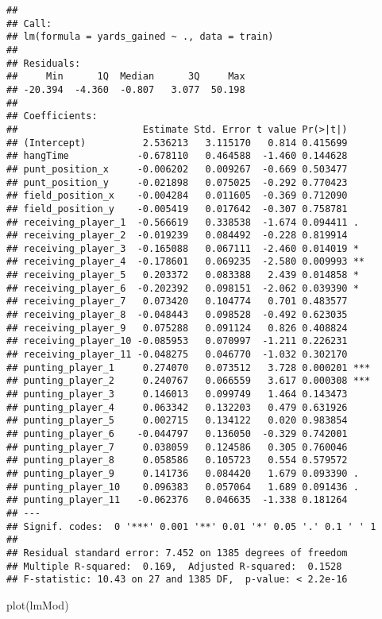 \documentclass[
]{article}
\newenvironment{Shaded}{\begin{snugshade}}{\end{snugshade}}
\newcommand{\FunctionTok}[1]{\textcolor[rgb]{0.00,0.00,0.00}{#1}}
\newcommand{\NormalTok}[1]{#1}
\begin{document}
\begin{verbatim}
## 
## Call:
## lm(formula = yards_gained ~ ., data = train)
## 
## Residuals:
##     Min      1Q  Median      3Q     Max 
## -20.394  -4.360  -0.807   3.077  50.198 
## 
## Coefficients:
##                      Estimate Std. Error t value Pr(>|t|)    
## (Intercept)          2.536213   3.115170   0.814 0.415699    
## hangTime            -0.678110   0.464588  -1.460 0.144628    
## punt_position_x     -0.006202   0.009267  -0.669 0.503477    
## punt_position_y     -0.021898   0.075025  -0.292 0.770423    
## field_position_x    -0.004284   0.011605  -0.369 0.712090    
## field_position_y    -0.005419   0.017642  -0.307 0.758781    
## receiving_player_1  -0.566619   0.338538  -1.674 0.094411 .  
## receiving_player_2  -0.019239   0.084492  -0.228 0.819914    
## receiving_player_3  -0.165088   0.067111  -2.460 0.014019 *  
## receiving_player_4  -0.178601   0.069235  -2.580 0.009993 ** 
## receiving_player_5   0.203372   0.083388   2.439 0.014858 *  
## receiving_player_6  -0.202392   0.098151  -2.062 0.039390 *  
## receiving_player_7   0.073420   0.104774   0.701 0.483577    
## receiving_player_8  -0.048443   0.098528  -0.492 0.623035    
## receiving_player_9   0.075288   0.091124   0.826 0.408824    
## receiving_player_10 -0.085953   0.070997  -1.211 0.226231    
## receiving_player_11 -0.048275   0.046770  -1.032 0.302170    
## punting_player_1     0.274070   0.073512   3.728 0.000201 ***
## punting_player_2     0.240767   0.066559   3.617 0.000308 ***
## punting_player_3     0.146013   0.099749   1.464 0.143473    
## punting_player_4     0.063342   0.132203   0.479 0.631926    
## punting_player_5     0.002715   0.134122   0.020 0.983854    
## punting_player_6    -0.044797   0.136050  -0.329 0.742001    
## punting_player_7     0.038059   0.124586   0.305 0.760046    
## punting_player_8     0.058586   0.105723   0.554 0.579572    
## punting_player_9     0.141736   0.084420   1.679 0.093390 .  
## punting_player_10    0.096383   0.057064   1.689 0.091436 .  
## punting_player_11   -0.062376   0.046635  -1.338 0.181264    
## ---
## Signif. codes:  0 '***' 0.001 '**' 0.01 '*' 0.05 '.' 0.1 ' ' 1
## 
## Residual standard error: 7.452 on 1385 degrees of freedom
## Multiple R-squared:  0.169,  Adjusted R-squared:  0.1528 
## F-statistic: 10.43 on 27 and 1385 DF,  p-value: < 2.2e-16
\end{verbatim}

\begin{Shaded}
\begin{Highlighting}[]
\FunctionTok{plot}\NormalTok{(lmMod)}
\end{Highlighting}
\end{Shaded}
\end{document}
